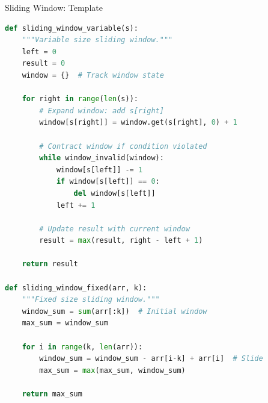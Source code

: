 \documentclass[aspectratio=169,xcolor=dvipsnames]{beamer}
\begin{document}
\begin{frame}[fragile]{Sliding Window: Template}
\begin{lstlisting}[language=Python, basicstyle=\tiny\ttfamily]
def sliding_window_variable(s):
    """Variable size sliding window."""
    left = 0
    result = 0
    window = {}  # Track window state

    for right in range(len(s)):
        # Expand window: add s[right]
        window[s[right]] = window.get(s[right], 0) + 1

        # Contract window if condition violated
        while window_invalid(window):
            window[s[left]] -= 1
            if window[s[left]] == 0:
                del window[s[left]]
            left += 1

        # Update result with current window
        result = max(result, right - left + 1)

    return result

def sliding_window_fixed(arr, k):
    """Fixed size sliding window."""
    window_sum = sum(arr[:k])  # Initial window
    max_sum = window_sum

    for i in range(k, len(arr)):
        window_sum = window_sum - arr[i-k] + arr[i]  # Slide
        max_sum = max(max_sum, window_sum)

    return max_sum
\end{lstlisting}
\end{frame}
\end{document}
